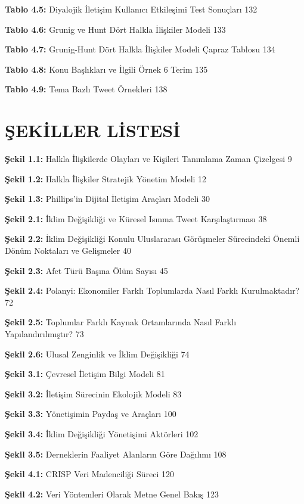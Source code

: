 \documentclass[
]{book}
\begin{document}
\textbf{Tablo 4.5:} Diyalojik İletişim Kullanıcı Etkileşimi Test Sonuçları 132

\textbf{Tablo 4.6:} Grunig ve Hunt Dört Halkla İlişkiler Modeli 133

\textbf{Tablo 4.7:} Grunig-Hunt Dört Halkla İlişkiler Modeli Çapraz Tablosu 134

\textbf{Tablo 4.8:} Konu Başlıkları ve İlgili Örnek 6 Terim 135

\textbf{Tablo 4.9:} Tema Bazlı Tweet Örnekleri 138

\hypertarget{ux15fekiller-listesi}{%
\chapter*{ŞEKİLLER LİSTESİ}\label{ux15fekiller-listesi}}

\textbf{Şekil 1.1:} Halkla İlişkilerde Olayları ve Kişileri Tanımlama Zaman Çizelgesi 9

\textbf{Şekil 1.2:} Halkla İlişkiler Stratejik Yönetim Modeli 12

\textbf{Şekil 1.3:} Phillips'in Dijital İletişim Araçları Modeli 30

\textbf{Şekil 2.1:} İklim Değişikliği ve Küresel Isınma Tweet Karşılaştırması 38

\textbf{Şekil 2.2:} İklim Değişikliği Konulu Uluslararası Görüşmeler Sürecindeki Önemli Dönüm Noktaları ve Gelişmeler 40

\textbf{Şekil 2.3:} Afet Türü Başına Ölüm Sayısı 45

\textbf{Şekil 2.4:} Polanyi: Ekonomiler Farklı Toplumlarda Nasıl Farklı Kurulmaktadır? 72

\textbf{Şekil 2.5:} Toplumlar Farklı Kaynak Ortamlarında Nasıl Farklı Yapılandırılmıştır? 73

\textbf{Şekil 2.6:} Ulusal Zenginlik ve İklim Değişikliği 74

\textbf{Şekil 3.1:} Çevresel İletişim Bilgi Modeli 81

\textbf{Şekil 3.2:} İletişim Sürecinin Ekolojik Modeli 83

\textbf{Şekil 3.3:} Yönetişimin Paydaş ve Araçları 100

\textbf{Şekil 3.4:} İklim Değişikliği Yönetişimi Aktörleri 102

\textbf{Şekil 3.5:} Derneklerin Faaliyet Alanların Göre Dağılımı 108

\textbf{Şekil 4.1:} CRISP Veri Madenciliği Süreci 120

\textbf{Şekil 4.2:} Veri Yöntemleri Olarak Metne Genel Bakış 123
\end{document}
